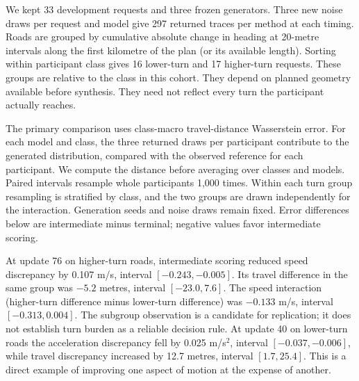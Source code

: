 We kept 33 development requests and three frozen generators. Three new noise draws per request and model give 297 returned traces per method at each timing. Roads are grouped by cumulative absolute change in heading at 20-metre intervals along the first kilometre of the plan (or its available length). Sorting within participant class gives 16 lower-turn and 17 higher-turn requests. These groups are relative to the class in this cohort. They depend on planned geometry available before synthesis. They need not reflect every turn the participant actually reaches.

The primary comparison uses class-macro travel-distance Wasserstein error. For each model and class, the three returned draws per participant contribute to the generated distribution, compared with the observed reference for each participant. We compute the distance before averaging over classes and models. Paired intervals resample whole participants 1,000 times. Within each turn group resampling is stratified by class, and the two groups are drawn independently for the interaction. Generation seeds and noise draws remain fixed. Error differences below are intermediate minus terminal; negative values favor intermediate scoring.


At update 76 on higher-turn roads, intermediate scoring reduced speed discrepancy by 0.107 m/s, interval $[-0.243,-0.005]$. Its travel difference in the same group was $-5.2$ metres, interval $[-23.0,7.6]$. The speed interaction (higher-turn difference minus lower-turn difference) was $-0.133$ m/s, interval $[-0.313,0.004]$. The subgroup observation is a candidate for replication; it does not establish turn burden as a reliable decision rule. At update 40 on lower-turn roads the acceleration discrepancy fell by 0.025 m/s$^2$, interval $[-0.037,-0.006]$, while travel discrepancy increased by 12.7 metres, interval $[1.7,25.4]$. This is a direct example of improving one aspect of motion at the expense of another.

